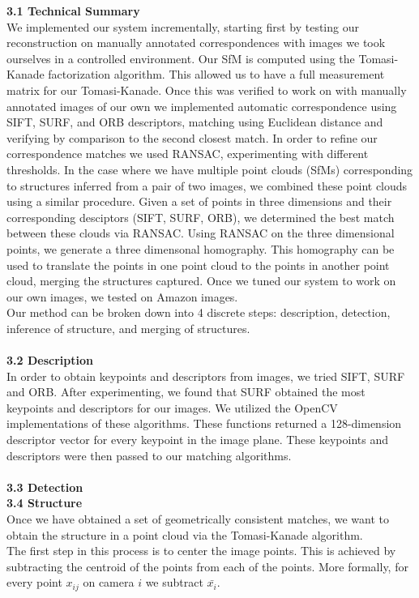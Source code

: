 \documentclass[12pt]{article}
\begin{document}
\begin{multicols}{2}
{\large \textbf{3.1 Technical Summary}}\\
We implemented our system incrementally, starting first by testing our reconstruction on manually annotated correspondences with images we took ourselves in a controlled environment. Our SfM is computed using the Tomasi-Kanade factorization algorithm. This allowed us to have a full measurement matrix for our Tomasi-Kanade. Once this was verified to work on with manually annotated images of our own we implemented automatic correspondence using SIFT, SURF, and ORB descriptors, matching using Euclidean distance and verifying by comparison to the second closest match. In order to refine our correspondence matches we used RANSAC, experimenting with different thresholds. In the case where we have multiple point clouds (SfMs) corresponding to structures inferred from a pair of two images, we combined these point clouds using a similar procedure. Given a set of points in three dimensions and their corresponding desciptors (SIFT, SURF, ORB), we determined the best match between these clouds via RANSAC. Using RANSAC on the three dimensional points, we generate a three dimensonal homography. This homography can be used to translate the points in one point cloud to the points in another point cloud, merging the structures captured. Once we tuned our system to work on our own images, we tested on Amazon images. \\
\indent Our method can be broken down into 4 discrete steps: description, detection, inference of structure, and merging of structures. \\\\
{\large \textbf{3.2 Description}}\\
In order to obtain keypoints and descriptors from images, we tried SIFT, SURF and ORB. After experimenting, we found that SURF obtained the most keypoints and descriptors for our images. We utilized the OpenCV implementations of these algorithms. These functions returned a 128-dimension descriptor vector for every keypoint in the image plane. These keypoints and descriptors were then passed to our matching algorithms.\\\\
{\large \textbf{3.3 Detection}}\\
{\large \textbf{3.4 Structure}}\\
Once we have obtained a set of geometrically consistent matches, we want to obtain the structure in a point cloud via the Tomasi-Kanade algorithm. \\
\indent The first step in this process is to center the image points. This is achieved by subtracting the centroid of the points from each of the points. More formally, for every point $x_{ij}$ on camera $i$ we subtract $\bar{x_{i}}$. 

\end{multicols}
\end{document}
